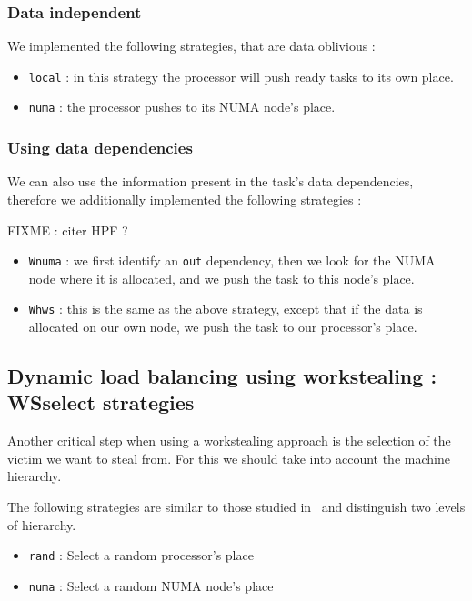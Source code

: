 \documentclass{Styles/llncs}
\begin{document}
\subsubsection{Data independent}

We implemented the following strategies, that are data oblivious :
\begin{itemize}
  \item \verb/local/ : in this strategy the processor will push ready tasks to
    its own place.
  \item \verb/numa/ : the processor pushes to its NUMA node's place.
\end{itemize}

\subsubsection{Using data dependencies}

We can also use the information present in the task's data dependencies,
therefore we additionally implemented the following strategies :

FIXME : citer HPF ?

\begin{itemize}
  \item \verb/Wnuma/ : we first identify an \verb/out/ dependency, then we
    look for the NUMA node where it is allocated, and we push the task to this
    node's place.
  \item \verb/Whws/ : this is the same as the above strategy, except that if
    the data is allocated on our own node, we push the task to our processor's place.
\end{itemize}


\subsection{Dynamic load balancing using workstealing : WSselect strategies}

Another critical step when using a workstealing approach is the selection of
the victim we want to steal from.
For this we should take into account the machine hierarchy.

The following strategies are similar to those studied in~\cite{DBLP:journals/ijhpca/OlivierPWSP12}
and distinguish two levels of hierarchy.

\begin{itemize}
  \item \verb/rand/ : Select a random processor's place
  \item \verb/numa/ : Select a random NUMA node's place
\end{itemize}
\end{document}
